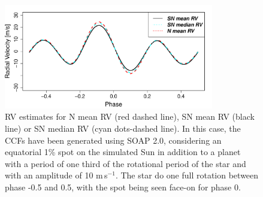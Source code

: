 \documentclass{aa}
\def\ms{\hbox{\,m\,s$^{-1}$}}         %
\begin{document}
\begin{figure}[htbp]
\begin{center}
\includegraphics[width = 3.6in]{RV_comparison_SPOT_PLANET.pdf} 
 \caption{RV estimates for N mean RV (red dashed line),  SN mean RV (black line) or SN median RV (cyan dots-dashed line). In this case, the CCFs have been generated using SOAP 2.0, considering an equatorial 1\% spot on the simulated Sun in addition to a planet with a period of one third of the rotational period of the star and with an amplitude of 10\,\ms. The star do one full rotation between phase -0.5 and 0.5, with the spot being seen face-on for phase 0.}
    \label{fig:spot.plus.planet}
\end{center}
\end{figure}
\end{document}
